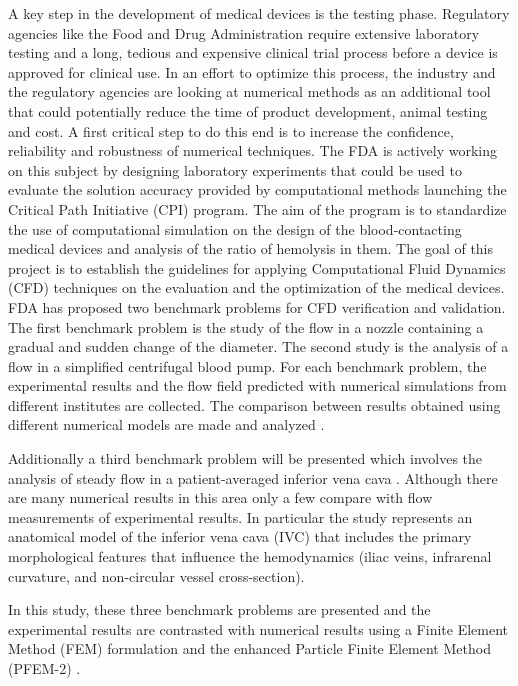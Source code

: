 A key step in the development of medical devices is the testing phase. Regulatory agencies like the Food and Drug Administration require extensive laboratory testing and a long, tedious and expensive clinical trial process before a device is approved for clinical use. In an effort to optimize this process, the industry and the regulatory agencies are looking at numerical methods as an additional tool that could potentially reduce the time of product development, animal testing and cost. A first critical step to do this end is to increase the confidence, reliability and robustness of numerical techniques. The FDA is actively working on this subject by designing laboratory experiments that could be used to evaluate the solution accuracy provided by computational methods launching the Critical Path Initiative (CPI) \cite{cpi} program. The aim of the program is to standardize the use of computational simulation on the design of the blood-contacting medical
devices and analysis of the ratio of hemolysis in them. The goal of this project is to establish the guidelines for
applying Computational Fluid Dynamics (CFD) techniques on the evaluation and the optimization of the medical devices. FDA has proposed two benchmark
problems \cite{cpi1} for CFD verification and validation. The first benchmark problem is the study of the flow in a nozzle
containing a gradual and sudden change of the diameter. The second study is the analysis of a flow in a simplified centrifugal
blood pump. For each benchmark
problem, the experimental results \cite{fda_res,fda_nozzle,fda_pump} and the flow field predicted with numerical simulations \cite{fda_numrob,hariharan_nozzle,nassau_pump,heck_hemo} from
different institutes are collected. The comparison between results obtained using different numerical models are
made and analyzed \cite{stewart_cfd,mali_cfd}. 

Additionally a third benchmark problem will be presented which involves the analysis of steady flow in a patient-averaged inferior vena cava \cite{gallagher_exp,craven_cfd}. Although there are many numerical results in this area only a few compare with flow measurements of experimental results. In particular the study represents an anatomical model of the  inferior vena cava (IVC) that includes the primary morphological features that influence the hemodynamics (iliac veins, infrarenal curvature, and non-circular vessel cross-section).

In this study, these three benchmark problems are presented and the experimental results are contrasted with numerical results using a Finite Element Method (FEM) formulation and the enhanced Particle Finite Element Method (PFEM-2) \cite{sergio:pfem}.

